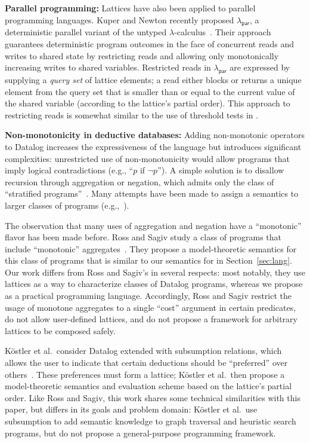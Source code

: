 \vspace{0.5em}\noindent
\textbf{Parallel programming:} Lattices have also been applied to parallel
programming languages. Kuper and Newton recently proposed
$\lambda_{\textsf{par}}$, a deterministic parallel variant of the untyped
$\lambda$-calculus~\cite{Kuper2012}. Their approach guarantees deterministic
program outcomes in the face of concurrent reads and writes to shared state by
restricting reads and allowing only monotonically increasing writes to shared
variables.  Restricted reads in $\lambda_{\textsf{par}}$ are expressed by
supplying a \emph{query set} of lattice elements; a read either blocks or
returns a unique element from the query set that is smaller than or equal to the
current value of the shared variable (according to the lattice's partial
order). This approach to restricting reads is somewhat similar to the use of
threshold tests in \lang.

\vspace{0.5em}\noindent
\textbf{Non-monotonicity in deductive databases:} Adding non-monotonic operators
to Datalog increases the expressiveness of the language but introduces
significant complexities: unrestricted use of non-monotonicity would allow
programs that imply logical contradictions (e.g., ``$p$ if $\lnot p$''). A
simple solution is to disallow recursion through aggregation or negation, which
admits only the class of ``stratified programs''~\cite{Apt1988}. Many attempts
have been made to assign a semantics to larger classes of programs
(e.g.,~\cite{Gelfond1988,Ross1990,VanGelder1991}).

The observation that many uses of aggregation and negation have a ``monotonic''
flavor has been made before. Ross and Sagiv study a class of programs that
include ``monotonic'' aggregates~\cite{Ross1992}. They propose a model-theoretic
semantics for this class of programs that is similar to our semantics for \lang
in Section~\ref{sec:lang}. Our work differs from Ross and Sagiv's in several
respects: most notably, they use lattices as a way to characterize classes of
Datalog programs, whereas we propose \lang as a practical programming
language. Accordingly, Ross and Sagiv restrict the usage of monotone aggregates
to a single ``cost'' argument in certain predicates, do not allow user-defined
lattices, and do not propose a framework for arbitrary lattices to be composed
safely.

K\"{o}stler et al.\ consider Datalog extended with subsumption relations, which
allows the user to indicate that certain deductions should be ``preferred'' over
others~\cite{Kostler1995}. These preferences must form a lattice; K\"{o}stler et
al.\ then propose a model-theoretic semantics and evaluation scheme based on the
lattice's partial order. Like Ross and Sagiv, this work shares some technical
similarities with this paper, but differs in its goals and problem domain:
K\"{o}stler et al.\ use subsumption to add semantic knowledge to graph traversal
and heuristic search programs, but do not propose a general-purpose programming
framework.

